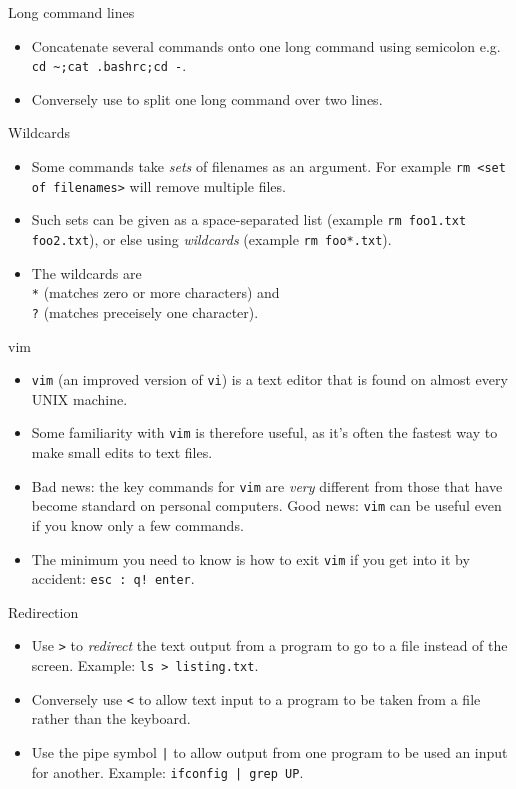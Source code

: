\documentclass[dvipsnames]{beamer}
\newcommand{\command}[1]{\colorbox{light-gray}{\texttt{#1}}}
\begin{document}
\begin{frame}{Long command lines}
  \begin{itemize}
  \item Concatenate several commands onto one long command using semicolon e.g. \command{cd \textasciitilde;cat .bashrc;cd -}.
  \item Conversely use \command{} to split one long command over two lines.
  \end{itemize}
\end{frame}


\begin{frame}{Wildcards}
  \begin{itemize}
  \item Some commands take \textit{sets} of filenames as an argument. For example \command{rm <set of filenames>} will remove multiple files.
  \item Such sets can be given as a space-separated list (example \command{rm foo1.txt foo2.txt}), or else using \textit{wildcards} (example \command{rm foo*.txt}).
  \item The wildcards are \\ \command{*} (matches zero or more characters) and \\ \command{?} (matches preceisely one character).
  \end{itemize}
\end{frame}


\begin{frame}{vim}
  \begin{itemize}
  \item \command{vim} (an improved version of \command{vi}) is a text editor that is found on almost every UNIX machine.
  \item Some familiarity with \command{vim} is therefore useful, as it's often the fastest way to make small edits to text files.
  \item Bad news: the key commands for \command{vim} are \textit{very} different from those that have become standard on personal computers. Good news:  \command{vim} can be useful even if you know only a few commands.
  \item The minimum you need to know is how to exit \command{vim} if you get into it by accident: \command{esc : q! enter}.
  \end{itemize}
\end{frame}


\begin{frame}{Redirection}
  \begin{itemize}
  \item Use \command{>} to \textit{redirect} the text output from a program to go to a file instead of the screen. Example: \command{ls >  listing.txt}.
  \item Conversely use \command{<} to allow text input to a program to be taken from a file rather than the keyboard.
  \item Use the pipe symbol \command{|} to allow output from one program to be used an input for another. Example: \command{ifconfig | grep UP}.
  \end{itemize}
\end{frame}
\end{document}
